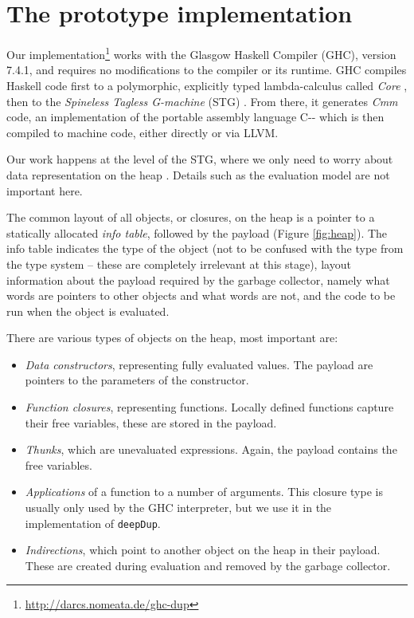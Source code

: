 \documentclass[preprint]{sigplanconf}
\theoremstyle{nonumberplain}
\newcommand{\li}{\lstinline[style=Haskell]}
\begin{document}
\section{The prototype implementation}
\label{sec:prototype}

Our implementation\footnote{\url{http://darcs.nomeata.de/ghc-dup}} works with the Glasgow Haskell Compiler (GHC), version 7.4.1, and requires no modifications to the compiler or its runtime. GHC compiles Haskell code first to a polymorphic, explicitly typed lambda-calculus called \emph{Core} \citep{core,system-fc}, then to the \emph{Spineless Tagless G-machine} (STG) \citep{stg}. From there, it generates \emph{Cmm} code, an implementation of the portable assembly language C-{}- which is then compiled to machine code, either directly or via LLVM.

Our work happens at the level of the STG, where we only need to worry about data representation on the heap \citep{stg}. Details such as the evaluation model \cite{evalapply} are not important here.

The common layout of all objects, or closures,  on the heap is a pointer to a statically allocated \emph{info table}, followed by the payload (Figure \ref{fig:heap}). The info table indicates the type of the object (not to be confused with the type from the type system – these are completely irrelevant at this stage), layout information about the payload required by the garbage collector, namely what words are pointers to other objects and what words are not, and the code to be run when the object is evaluated.

There are various types of objects on the heap, most important are:
\begin{itemize}
\item \emph{Data constructors}, representing fully evaluated values. The payload are pointers to the parameters of the constructor.
\item \emph{Function closures}, representing functions. Locally defined functions capture their free variables, these are stored in the payload.
\item \emph{Thunks}, which are unevaluated expressions. Again, the payload contains the free variables.
\item \emph{Applications} of a function to a number of arguments. This closure type is usually only used by the GHC interpreter, but we use it in the implementation of \li-deepDup-.
\item \emph{Indirections}, which point to another object on the heap in their payload. These are created during evaluation and removed by the garbage collector.
\end{itemize}
\end{document}
